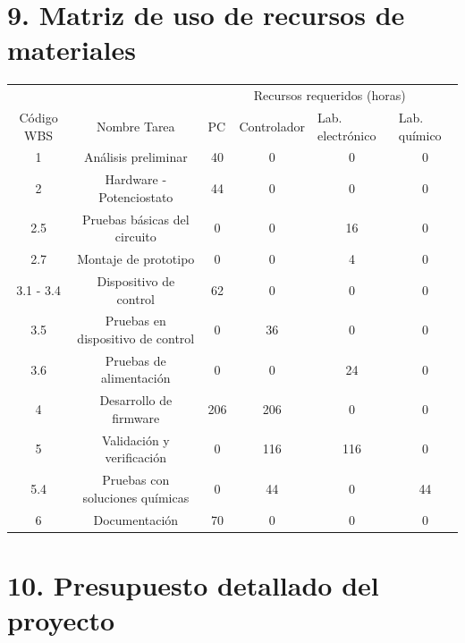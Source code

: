 \documentclass[11pt]{charter}
\begin{document}
\section{9. Matriz de uso de recursos de materiales}
\label{sec:recursos}

\begin{table}[H]
\label{tab:recursos}
\begin{tabular}{|c|c|c|c|c|c|}
\hline
\cellcolor[HTML]{C0C0C0} &
  \cellcolor[HTML]{C0C0C0} &
  \multicolumn{4}{c|}{\cellcolor[HTML]{C0C0C0}Recursos requeridos (horas)} \\ \cline{3-6} 
\multirow{-2}{*}{\cellcolor[HTML]{C0C0C0}Código WBS} &
  \multirow{-2}{*}{\cellcolor[HTML]{C0C0C0}Nombre Tarea} &
  \multicolumn{1}{l|}{PC} &
  \multicolumn{1}{l|}{Controlador} &
  \multicolumn{1}{l|}{Lab. electrónico} &
  \multicolumn{1}{l|}{Lab. químico} \\ \hline
1         & Análisis preliminar             & 40  & 0   & 0   & 0  \\ \hline
2         & Hardware - Potenciostato        & 44  & 0   & 0   & 0  \\ \hline
2.5       & Pruebas básicas del circuito    & 0   & 0   & 16  & 0  \\ \hline
2.7       & Montaje de prototipo            & 0   & 0   & 4   & 0  \\ \hline
3.1 - 3.4 & Dispositivo de control          & 62  & 0   & 0   & 0  \\ \hline
3.5       & Pruebas en dispositivo de control & 0   & 36  & 0   & 0  \\ \hline
3.6       & Pruebas de alimentación         & 0   & 0   & 24  & 0  \\ \hline
4         & Desarrollo de firmware          & 206 & 206 & 0   & 0  \\ \hline
5         & Validación y verificación       & 0   & 116 & 116 & 0  \\ \hline
5.4       & Pruebas con soluciones químicas & 0   & 44  & 0   & 44 \\ \hline
6         & Documentación                   & 70  & 0   & 0   & 0  \\ \hline
\end{tabular}
\end{table}


\section{10. Presupuesto detallado del proyecto}
\label{sec:presupuesto}
\end{document}
